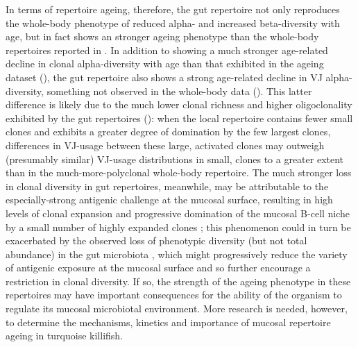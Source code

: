 In terms of repertoire ageing, therefore, the gut repertoire not only reproduces the whole-body phenotype of reduced alpha- and increased beta-diversity with age, but in fact shows an stronger ageing phenotype than the whole-body repertoires reported in . In addition to showing a much stronger age-related decline in clonal alpha-diversity with age than that exhibited in the ageing dataset (), the gut repertoire also shows a strong age-related decline in VJ alpha-diversity, something not observed in the whole-body data (). This latter difference is likely due to the much lower clonal richness and higher oligoclonality exhibited by the gut repertoires (): when the local repertoire contains fewer small \naive clones and exhibits a greater degree of domination by the few largest clones, differences in VJ-usage between these large, activated clones may outweigh (presumably similar) VJ-usage distributions in small, \naive clones to a greater extent than in the much-more-polyclonal whole-body repertoire. The much stronger loss in clonal diversity in gut repertoires, meanwhile, may be attributable to the especially-strong antigenic challenge at the mucosal surface, resulting in high levels of clonal expansion and progressive domination of the mucosal B-cell niche by a small number of highly expanded clones \parencite{caruso2009immunosenescence}; this phenomenon could in turn be exacerbated by the observed loss of phenotypic diversity (but not total abundance) in the gut microbiota \parencite{smith2017microbiota}, which might progressively reduce the variety of antigenic exposure at the mucosal surface and so further encourage a restriction in clonal diversity. If so, the strength of the ageing phenotype in these repertoires may have important consequences for the ability of the organism to regulate its mucosal microbiotal environment. More research is needed, however, to determine the mechanisms, kinetics and importance of mucosal repertoire ageing in turquoise killifish.

